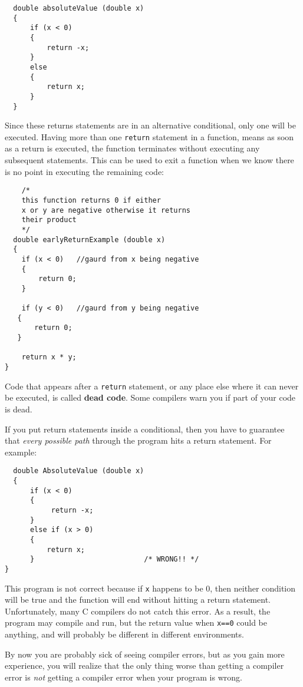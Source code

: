 \begin{verbatim}
  double absoluteValue (double x) 
  {
      if (x < 0) 
      {
          return -x;
      } 
      else 
      {
          return x;
      }
  }
\end{verbatim}
%
Since these returns statements are in an alternative conditional, only
one will be executed.  Having more than one
{\tt return} statement in a function, means as soon
as a return is executed, the function terminates without executing any
subsequent statements. This can be used to exit a function when 
we know there is no point in executing the remaining code:

\begin{verbatim}
	/*
	this function returns 0 if either 
	x or y are negative otherwise it returns
	their product
	*/
  double earlyReturnExample (double x) 
  {
	if (x < 0)   //gaurd from x being negative
	{
		return 0;
	} 

   	if (y < 0)   //gaurd from y being negative
   {
   	   return 0;
   } 

	return x * y;
}
\end{verbatim}
%

Code that appears after a {\tt return} statement, or any place else
where it can never be executed, is called {\bf dead code}.  Some
compilers warn you if part of your code is dead.


If you put return statements inside a conditional, then
you have to guarantee that {\em every possible path} through
the program hits a return statement.  For example:

\begin{verbatim}
  double AbsoluteValue (double x) 
  {
      if (x < 0) 
      {
           return -x;
      } 
      else if (x > 0) 
      {
          return x;
      }                          /* WRONG!! */
}
\end{verbatim}
%
This program is not correct because if {\tt x} happens to be 0, then
neither condition will be true and the function will end without hitting
a return statement.  Unfortunately, many C compilers do not catch
this error.  As a result, the program may compile and run, but the
return value when {\tt x==0} could be anything, and will probably
be different in different environments.


By now you are probably sick of seeing compiler errors, but as you
gain more experience, you will realize that the only thing worse
than getting a compiler error is {\em not} getting a compiler error
when your program is wrong.

